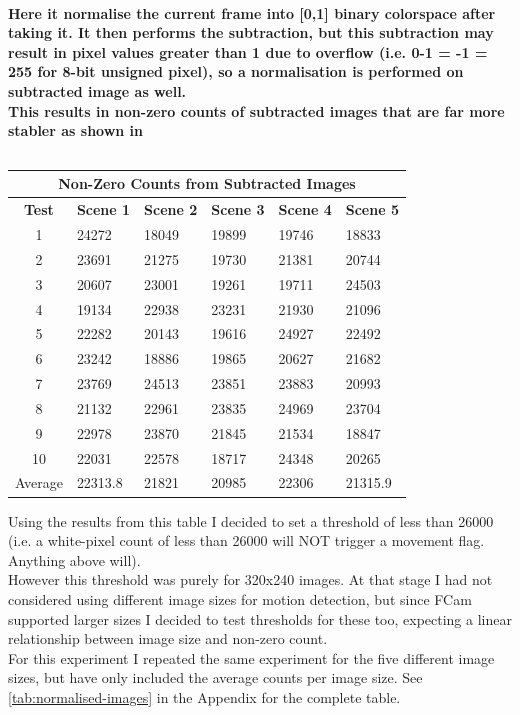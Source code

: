 \paragraph{Here it normalise the current frame into [0,1] binary colorspace after taking it. It then performs the subtraction, but this subtraction may result in pixel values greater than 1 due to overflow (i.e. 0-1 = -1 = 255 for 8-bit unsigned pixel), so a normalisation is performed on subtracted image as well. \\
This results in non-zero counts of subtracted images that are far more stabler as shown in }
\begin{center}
\begin{table}[!htbp]
	\begin{tabular}{| c | l | l | l | l | l | }
\hline
\multicolumn{6}{|c|}{\bf Non-Zero Counts from Subtracted Images} \\
\hline
\bf Test	&\bf Scene 1	&\bf Scene 2	&\bf Scene 3	&\bf Scene 4	&\bf Scene 5	\\ \hline
1	&24272	&18049	&19899	&19746	&18833\\
2	&23691	&21275	&19730	&21381	&20744\\
3	&20607	&23001	&19261	&19711	&24503\\
4	&19134	&22938	&23231	&21930	&21096\\
5	&22282	&20143	&19616	&24927	&22492\\
6	&23242	&18886	&19865	&20627	&21682\\
7	&23769	&24513	&23851	&23883	&20993\\
8	&21132	&22961	&23835	&24969	&23704\\
9	&22978	&23870	&21845	&21534	&18847\\
10	&22031	&22578	&18717	&24348	&20265\\ \hline
Average	&22313.8	&21821	&20985	&22306	&21315.9	\\ \hline
	\end{tabular}
\caption{}
\vspace{-8pt}
\label{tab:sub2}
\end{table}
\end{center}
Using the results from this table I decided to set a threshold of less than 26000 (i.e. a white-pixel count of less than 26000 will NOT trigger a movement flag. Anything above will). 
\\However this threshold was purely for 320x240 images. At that stage I had not considered using different image sizes  for motion detection, but since FCam supported larger sizes I decided to test thresholds for these too, expecting a linear relationship between image size and non-zero count.
\\For this experiment I repeated the same experiment for the five different image sizes, but have only included the average counts per image size. See \ref{tab:normalised-images} in the Appendix for the complete table.\\

